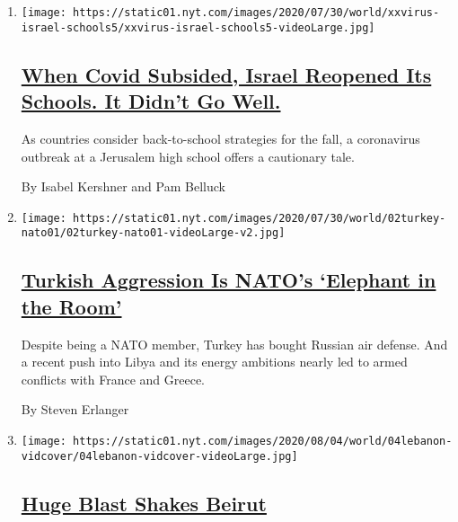 \begin{enumerate}
\def\labelenumi{\arabic{enumi}.}
\item
  \texttt{[image: https://static01.nyt.com/images/2020/07/30/world/xxvirus-israel-schools5/xxvirus-israel-schools5-videoLarge.jpg]}

  \hypertarget{when-covid-subsided-israel-reopened-its-schools-it-didnt-go-well}{%
  \subsection{\texorpdfstring{\href{/2020/08/04/world/middleeast/coronavirus-israel-schools-reopen.html}{When
  Covid Subsided, Israel Reopened Its Schools. It Didn't Go
  Well.}}{When Covid Subsided, Israel Reopened Its Schools. It Didn't Go Well.}}\label{when-covid-subsided-israel-reopened-its-schools-it-didnt-go-well}}

  As countries consider back-to-school strategies for the fall, a
  coronavirus outbreak at a Jerusalem high school offers a cautionary
  tale.

  By Isabel Kershner and Pam Belluck
\item
  \texttt{[image: https://static01.nyt.com/images/2020/07/30/world/02turkey-nato01/02turkey-nato01-videoLarge-v2.jpg]}

  \hypertarget{turkish-aggression-is-natos-elephant-in-the-room}{%
  \subsection{\texorpdfstring{\href{/2020/08/03/world/europe/turkey-nato.html}{Turkish
  Aggression Is NATO's `Elephant in the
  Room'}}{Turkish Aggression Is NATO's `Elephant in the Room'}}\label{turkish-aggression-is-natos-elephant-in-the-room}}

  Despite being a NATO member, Turkey has bought Russian air defense.
  And a recent push into Libya and its energy ambitions nearly led to
  armed conflicts with France and Greece.

  By Steven Erlanger
\item
  \texttt{[image: https://static01.nyt.com/images/2020/08/04/world/04lebanon-vidcover/04lebanon-vidcover-videoLarge.jpg]}

  \hypertarget{huge-blast-shakes-beirut}{%
  \subsection{\texorpdfstring{\href{/video/world/100000007272075/lebanon-beirut-blast.html}{Huge
  Blast Shakes
  Beirut}}{Huge Blast Shakes Beirut}}\label{huge-blast-shakes-beirut}}


\end{enumerate}
